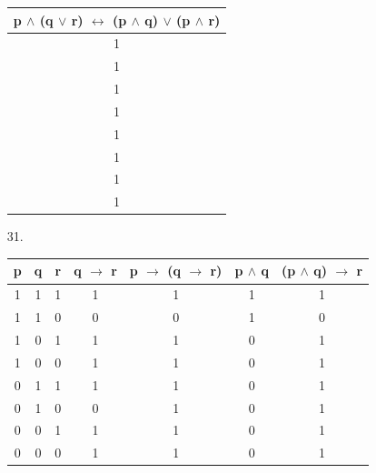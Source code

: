 \documentclass[12pt]{article}
\begin{document}
\begin{enumerate}[label = \alph*)]
\begin{itemize}
\begin{tabular}{ccc|c|c|c|c|c}
                \end{tabular}
            \item []
                \begin{center}
                    \begin{tabular}{c}
                        p $\wedge$ (q $\vee$ r) $\leftrightarrow$ (p $\wedge$ q)
                                $\vee$ (p $\wedge$ r)\\
                        \hline
                        1 \\
                        1 \\
                        1 \\
                        1 \\
                        1 \\
                        1 \\
                        1 \\
                        1 \\
                    \end{tabular}
                \end{center}
            \item [31.]
                \vspace{2em}
                \begin{tabular}{ccc|c|c|c|c}
                    p & q & r & q $\rightarrow$ r & p $\rightarrow$ (q $\rightarrow$ r) & 
                            p $\wedge$ q & (p $\wedge$ q) $\rightarrow$ r \\
                    \hline
                    1 & 1 & 1 & 1 & 1 & 1 & 1 \\
                    1 & 1 & 0 & 0 & 0 & 1 & 0 \\
                    1 & 0 & 1 & 1 & 1 & 0 & 1 \\
                    1 & 0 & 0 & 1 & 1 & 0 & 1 \\
                    0 & 1 & 1 & 1 & 1 & 0 & 1 \\
                    0 & 1 & 0 & 0 & 1 & 0 & 1 \\
                    0 & 0 & 1 & 1 & 1 & 0 & 1 \\
                    0 & 0 & 0 & 1 & 1 & 0 & 1 \\
                \end{tabular}
            \item []
                \begin{center}
                    \begin{tabular}{c}

\end{tabular}
\end{center}
\end{itemize}
\end{enumerate}
\end{document}
